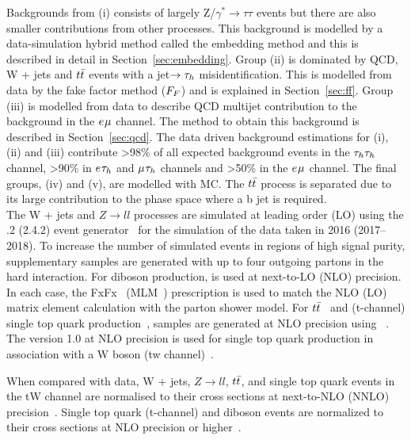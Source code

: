 Backgrounds from (i) consists of largely Z/$\gamma^* \rightarrow \tau\tau$ events but there are also smaller contributions from other processes. 
This background is modelled by a data-simulation hybrid method called the embedding method and this is described in detail in Section~\ref{sec:embedding}.
Group (ii) is dominated by QCD, W + jets and $t\bar{t}$ events with a jet$\rightarrow \tau_{h}$ misidentification.
This is modelled from data by the fake factor method ($F_{F}$) and is explained in Section~\ref{sec:ff}.
Group (iii) is modelled from data to describe QCD multijet contribution to the background in the $e_{}\mu_{}$ channel.
The method to obtain this background is described in Section~\ref{sec:qcd}.
The data driven background estimations for (i), (ii) and (iii) contribute >98\% of all expected background events in the $\tau_{h}\tau_{h}$ channel, >90\% in $e_{}\tau_{h}$ and $\mu_{}\tau_{h}$ channels and >50\% in the $e_{}\mu_{}$ channel.
The final groups, (iv) and (v), are modelled with MC.
The $t\bar{t}$ process is separated due to its large contribution to the phase space where a b jet is required. \\

The W + jets and $Z\rightarrow ll$ processes are simulated at leading order (LO) using the .2 (2.4.2) event generator~\cite{Alwall:2011uj,Alwall:2014hca} for the simulation of the data taken in 2016 (2017--2018). 
To increase the number of simulated events in regions of high signal purity, supplementary samples are generated with up to four outgoing partons in the hard interaction. 
For diboson production, \MGvATNLO is used at next-to-LO (NLO) precision. 
In each case, the FxFx~\cite{Frederix:2012ps} (MLM~\cite{Alwall:2007fs})  prescription is used to match the NLO (LO) matrix element calculation with the parton shower model. 
For $t\bar{t}$~\cite{Alioli:2011as} and (t-channel) single top quark production~\cite{Frederix:2012dh}, samples are generated at NLO precision using ~\cite{Nason:2004rx,Frixione:2007vw,Alioli:2010xd,Jezo2015aia}. 
The \POWHEG version 1.0 at NLO precision is used for single top quark production in association with a W boson (tw channel)~\cite{Re:2010bp}. 

When compared with data, W + jets, $Z\rightarrow ll$, $t\bar{t}$, and single top quark events in the tW channel are normalised to their cross sections at next-to-NLO (NNLO) precision~\cite{Melnikov:2006kv,Czakon:2011xx,Kidonakis:2013zqa}. 
Single top quark (t-channel) and diboson events are normalized to their cross sections at NLO precision or higher~\cite{Kidonakis:2013zqa,Campbell:2011bn,Gehrmann:2014fva}.

